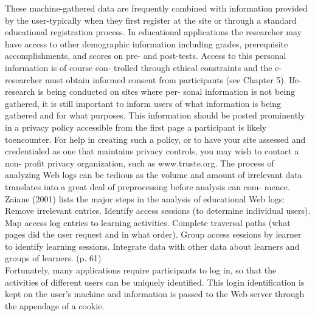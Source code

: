 \documentclass[a4paper,12pt]{article}
\begin{document}
\noindent
These machine-gathered data are frequently combined with information provided by the user-typically when they first register at the site or through a standard educational registration process. In educational applications the researcher may have access to other demographic information including grades, prerequisite accomplishments, and scores on pre- and post-tests. Access to this personal information is of course con- trolled through ethical constraints and the e-researcher must obtain informed consent from participants (see Chapter 5). Ife-research is being conducted on sites where per- sonal information is not being gathered, it is still important to inform users of what information is being gathered and for what purposes. This information should be posted prominently in a privacy policy accessible from the first page a participant is likely toencounter. For help in creating such a policy, or to have your site assessed and credentialed as one that maintains privacy controls, you may wish to contact a non- profit privacy organization, such as www.truste.org. The process of analyzing Web logs can be tedious as the volume and amount of irrelevant data translates into a great deal of preprocessing before analysis can com- mence. Zaiane (2001) lists the major steps in the analysis of educational Web logs:\\

\noindent
Remove irrelevant entries. 
 Identify access sessions (to determine individual users).
 Map access log entries to learning activities.
 Complete traversal paths (what pages did the user request and in what order). 
 Group access sessions by learner to identify learning sessions. 
 Integrate data with other data about learners and groups of learners. (p. 61)\\


\noindent
 Fortunately, many applications require participants to log in, so that the activities of different users can be uniquely identified. This login identification is kept on the user's machine and information is passed to the Web server through the appendage of a cookie.\\
    
\end{document}
